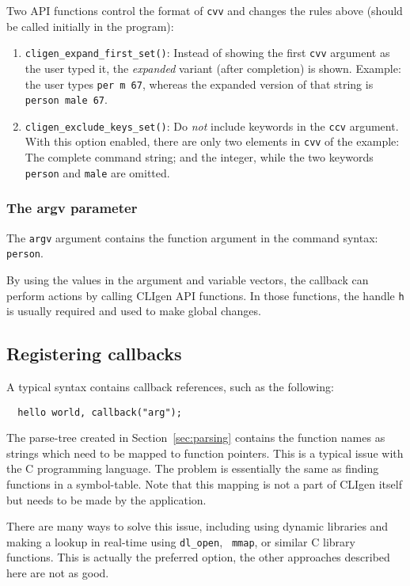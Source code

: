 \documentclass[a4paper, 10pt] {article}
\begin{document}
Two API functions control the format of {\tt cvv} and changes the rules above (should be called initially in the program):
\begin{enumerate}
\item {\tt cligen\_expand\_first\_set()}: Instead of showing the first {\tt cvv} argument as the user typed it, the \emph{expanded} variant (after completion) is shown. Example: the user types {\tt per m 67}, whereas the expanded version of that string is {\tt person male 67}.
\item {\tt cligen\_exclude\_keys\_set()}: Do \emph{not} include keywords in the {\tt ccv} argument. With this option enabled, there are only two elements in {\tt cvv} of the example: The complete command string; and the integer, while the two keywords {\tt person} and {\tt male} are omitted.
\end{enumerate}

\subsubsection{The argv parameter}

The {\tt argv} argument contains the function argument in the command syntax: {\tt person}.

By using the values in the argument and variable vectors, the callback
can perform actions by calling CLIgen API functions. In those
functions, the handle {\tt h} is usually required and used to make
global changes. 

\subsection{Registering callbacks}

A typical syntax contains callback references, such as the following:
\begin{verbatim}
  hello world, callback("arg");
\end{verbatim}

The parse-tree created in Section~\ref{sec:parsing} contains the
function names as strings which need to be mapped to function
pointers. This is a typical issue with the C programming language. The
problem is essentially the same as finding functions in a
symbol-table. Note that this mapping is not a part of CLIgen itself
but needs to be made by the application.

There are many ways to solve this issue, including using dynamic
libraries and making a lookup in real-time using {\tt dl\_open}, {\tt
  mmap}, or similar C library functions. This is actually the
preferred option, the other approaches described here are not as good.
\end{document}
